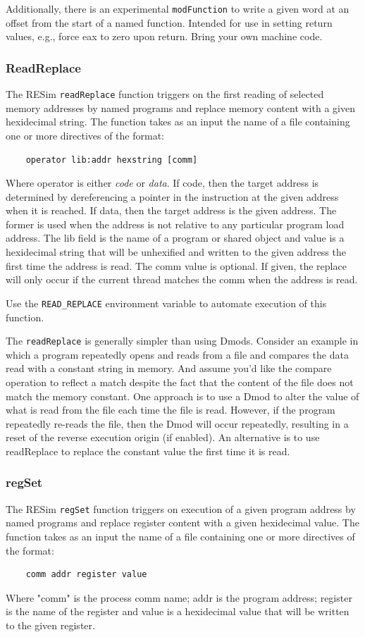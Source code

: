 \documentclass[titlepage]{article}
\begin{document}
Additionally, there is an experimental {\tt modFunction} to write a given word at an offset from the start of a named function.  
Intended for use in setting return values, e.g., force eax to zero upon return.  Bring your own machine code.  

\subsubsection{ReadReplace}
\label{read-replace}
The RESim {\tt readReplace} function triggers on the first reading of selected memory addresses
by named programs and replace memory content with a given hexidecimal string.  The function takes as an
input the name of a file containing one or more directives of the format:
\begin{verbatim}
    operator lib:addr hexstring [comm]
\end{verbatim}

Where operator is either \textit{code} or \textit{data}.  If code, then the target
address is determined by dereferencing a pointer in the instruction
at the given address when it is reached.  If data, then the target
address is the given address. The former is used when the address is not relative
to any particular program load address. 
The lib field is the name of a program or shared object and value
is a hexidecimal string that will be unhexified and written to the given
address the first time the address is read.  
The comm value is optional.  If given, the replace will only occur if the
current thread matches the comm when the address is read.

Use the {\tt READ\_REPLACE} environment variable to automate execution of this function.

The {\tt readReplace} is generally simpler than using Dmods.  Consider an example in which a program
repeatedly opens and reads from a file and compares the data read with a constant string in memory.
And assume you'd like the compare operation to reflect a match despite the fact that the content of
the file does not match the memory constant.  One approach is to use a Dmod to alter the value of what
is read from the file each time the file is read.  However, if the program repeatedly re-reads the file,
then the Dmod will occur repeatedly, resulting in a reset of the reverse execution origin (if enabled).
An alternative is to use readReplace to replace the constant value the first time it is read.  

\subsubsection{regSet}
\label{reg-set}
The RESim {\tt regSet} function triggers on execution of a given program address
by named programs and replace register content with a given hexidecimal value.  The function takes as an
input the name of a file containing one or more directives of the format:
\begin{verbatim}
    comm addr register value
\end{verbatim}
Where "comm" is the process comm name; addr is the program address; register is the
name of the register and value is a hexidecimal value that will be written to the given
register.
\end{document}
